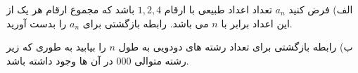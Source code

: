 \exercise
الف) فرض کنید 
$a_n$
تعداد اعداد طبیعی با ارقام
$1, 2, 4$
باشد که مجموع ارقام هر یک از این اعداد برابر با
$n$
می باشد. رابطه بازگشتی برای
$a_n$
را بدست آورید.

ب) رابطه بازگشتی برای تعداد رشته های دودویی به طول
$n$
را بیابید به طوری که زیر رشته متوالی
$000$
در آن ها وجود داشته باشد.